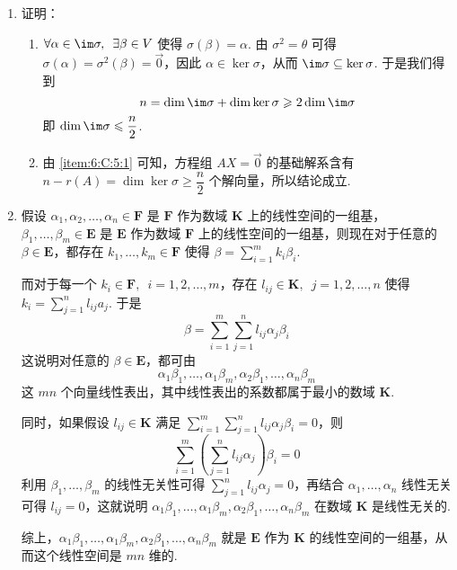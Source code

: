 \begin{enumerate}
    \item 证明：\begin{enumerate}
              \item \label{item:6:C:5:1}
                    $ \forall \alpha \in \im \sigma,\enspace \exists \beta \in V $ 使得 $ \sigma(\beta) = \alpha $. 由 $ \sigma^2 = \theta $ 可得 $ \sigma(\alpha) = \sigma^2(\beta) = \vec{0} $，因此 $ \alpha \in \ker \sigma $，从而 $ \im \sigma \subseteq \ker \sigma $. 于是我们得到
                    \[ n = \dim \im \sigma + \dim \ker \sigma \geqslant 2 \dim \im \sigma \]
                    即 $ \dim \im \sigma \leqslant \dfrac{n}{2} $.

              \item 由 \ref*{item:6:C:5:1} 可知，方程组 $ AX = \vec{0} $ 的基础解系含有 $ n - r(A) = \dim \ker \sigma \geqslant \dfrac{n}{2} $ 个解向量，所以结论成立.
          \end{enumerate}

    \item 假设 $ \alpha_1, \alpha_2, \ldots, \alpha_n \in \mathbf{F} $ 是 $ \mathbf{F} $ 作为数域 $ \mathbf{K} $ 上的线性空间的一组基，$ \beta_1, \ldots, \beta_m \in \mathbf{E} $ 是 $ \mathbf{E} $ 作为数域 $ \mathbf{F} $ 上的线性空间的一组基，则现在对于任意的 $ \beta \in \mathbf{E} $，都存在 $ k_1, \ldots, k_m \in \mathbf{F} $ 使得 $ \beta = \displaystyle\sum_{i = 1}^{m} k_i \beta_i $.

          而对于每一个 $ k_i \in \mathbf{F},\enspace i = 1, 2, \ldots, m $，存在 $ l_{ij} \in \mathbf{K},\enspace j = 1, 2, \ldots, n $ 使得 $ k_i = \displaystyle\sum_{j = 1}^{n} l_{ij} a_j $. 于是
          \[ \beta = \sum_{i = 1}^{m} \sum_{j = 1}^{n} l_{ij} \alpha_j \beta_i \]
          这说明对任意的 $ \beta \in \mathbf{E} $，都可由
          \[ \alpha_1 \beta_1, \ldots, \alpha_1 \beta_m, \alpha_2 \beta_1, \ldots, \alpha_n \beta_m \]
          这 $ mn $ 个向量线性表出，其中线性表出的系数都属于最小的数域 $ \mathbf{K} $.

          同时，如果假设 $ l_{ij} \in \mathbf{K} $ 满足 $ \displaystyle\sum_{i = 1}^{m} \sum_{j = 1}^{n} l_{ij} \alpha_j \beta_i = 0 $，则
          \[ \sum_{i = 1}^{m} \left(\sum_{j = 1}^{n} l_{ij} \alpha_j\right) \beta_i = 0 \]
          利用 $ \beta_1, \ldots, \beta_m $ 的线性无关性可得 $ \displaystyle\sum_{j = 1}^{n} l_{ij} \alpha_j = 0 $，再结合 $ \alpha_1, \ldots, \alpha_n $ 线性无关可得 $ l_{ij} = 0 $，这就说明 $ \alpha_1 \beta_1, \ldots, \alpha_1 \beta_m, \alpha_2 \beta_1, \ldots, \alpha_n \beta_m $ 在数域 $ \mathbf{K} $ 是线性无关的.

          综上，$ \alpha_1 \beta_1, \ldots, \alpha_1 \beta_m, \alpha_2 \beta_1, \ldots, \alpha_n \beta_m $ 就是 $ \mathbf{E} $ 作为 $ \mathbf{K} $ 的线性空间的一组基，从而这个线性空间是 $ mn $ 维的.
\end{enumerate}

\clearpage

